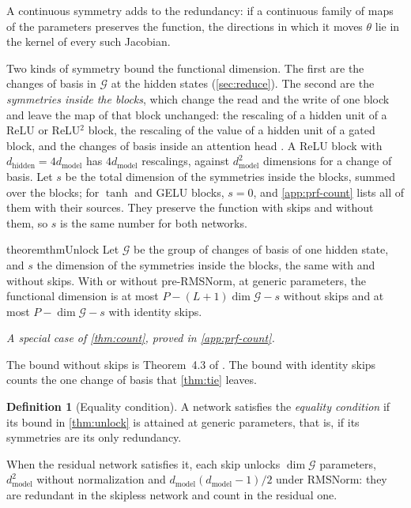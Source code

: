 \documentclass[10pt]{article}
\theoremstyle{definition}
\newtheorem{definition}[theorem]{Definition}
\theoremstyle{remark}
\newcommand{\dm}{d_{\mathrm{model}}}
\newcommand{\dhid}{d_{\mathrm{hidden}}}
\newcommand{\G}{\mathcal{G}}
\newcommand{\specialof}[2]{\par\vspace{-0.4\baselineskip}\noindent\hfill{\small\itshape A special case of \cref{#1}, proved in \cref{#2}.}\par\smallskip}
\newcommand{\KDbound}{4.3}    %
\begin{document}
A continuous symmetry adds to the redundancy: if a continuous family of maps of the parameters preserves the function, the directions in which it moves $\theta$ lie in the kernel of every such Jacobian.

Two kinds of symmetry bound the functional dimension. The first are the changes of basis in $\G$ at the hidden states (\cref{sec:reduce}). The second are the \emph{symmetries inside the blocks}, which change the read and the write of one block and leave the map of that block unchanged: the rescaling of a hidden unit of a ReLU or ReLU$^2$ block, the rescaling of the value of a hidden unit of a gated block, and the changes of basis inside an attention head \citep{rolnick2020reverse,godfrey2022symmetries,elhage2021circuits,wang2025gauge}. A ReLU block with $\dhid = 4\dm$ has $4\dm$ rescalings, against $\dm^2$ dimensions for a change of basis. Let $s$ be the total dimension of the symmetries inside the blocks, summed over the blocks; for $\tanh$ and GELU blocks, $s = 0$, and \cref{app:prf-count} lists all of them with their sources. They preserve the function with skips and without them, so $s$ is the same number for both networks.

\begin{restatable}{theorem}{thmUnlock}\label{thm:unlock}
Let $\G$ be the group of changes of basis of one hidden state, and $s$ the dimension of the symmetries inside the blocks, the same with and without skips. With or without pre-RMSNorm, at generic parameters, the functional dimension is at most $P - (L+1)\dim\G - s$ without skips and at most $P - \dim\G - s$ with identity skips.
\end{restatable}
\specialof{thm:count}{app:prf-count}

The bound without skips is Theorem~\KDbound{} of \citet{karbevski2026dimension}. The bound with identity skips counts the one change of basis that \cref{thm:tie} leaves.

\begin{definition}[Equality condition]\label{def:equality}
A network satisfies the \emph{equality condition} if its bound in \cref{thm:unlock} is attained at generic parameters, that is, if its symmetries are its only redundancy.
\end{definition}

When the residual network satisfies it, each skip unlocks $\dim\G$ parameters, $\dm^2$ without normalization and $\dm(\dm-1)/2$ under RMSNorm: they are redundant in the skipless network and count in the residual one.
\end{document}
